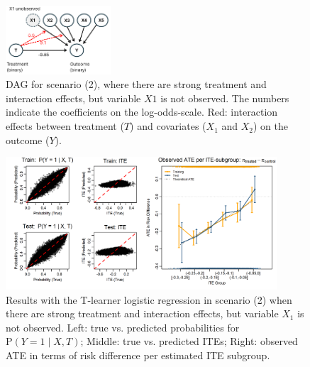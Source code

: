 \begin{figure}[htbp]
\centering
\includegraphics[width=0.35\textwidth]{img/results_ITE_simulation/simulation_unobserved.png}
\caption{DAG for scenario (2), where there are strong treatment and interaction effects, but variable $X1$ is not observed. The numbers indicate the coefficients on the log-odds-scale. Red: interaction effects between treatment ($T$) and covariates ($X_1$ and $X_2$) on the outcome ($Y$).}
\label{fig:unobserved_interaction_dag}
\end{figure}



\begin{figure}[htbp]
\centering
\includegraphics[width=0.9\textwidth]{img/results_ITE_simulation/unobserved_interaction_glm_tlearner.png}
\caption{Results with the T-learner logistic regression in scenario (2) when there are strong treatment and interaction effects, but variable $X_1$ is not observed. Left: true vs. predicted probabilities for $\text{P}(Y=1 \mid X, T)$; Middle: true vs. predicted ITEs; Right: observed ATE in terms of risk difference per estimated ITE subgroup.}
\label{fig:unobserved_interaction_glm_tlearner}
\end{figure}



